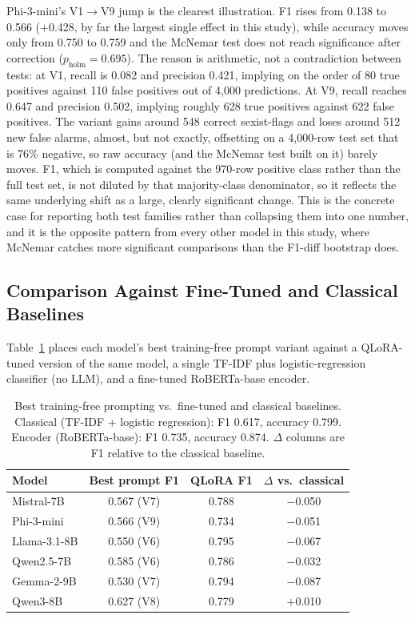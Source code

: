 Phi-3-mini's V1$\to$V9 jump is the clearest illustration. F1 rises from
0.138 to 0.566 (+0.428, by far the largest single effect in this study),
while accuracy moves only from 0.750 to 0.759 and the McNemar test does
not reach significance after correction ($p_{\text{holm}}=0.695$). The
reason is arithmetic, not a contradiction between tests: at V1, recall
is 0.082 and precision 0.421, implying on the order of 80 true positives
against 110 false positives out of 4{,}000 predictions. At V9, recall
reaches 0.647 and precision 0.502, implying roughly 628 true positives
against 622 false positives. The variant gains around 548 correct
sexist-flags and loses around 512 new false alarms, almost, but not
exactly, offsetting on a 4{,}000-row test set that is 76\% negative, so
raw accuracy (and the McNemar test built on it) barely moves. F1, which
is computed against the 970-row positive class rather than the full
test set, is not diluted by that majority-class denominator, so it
reflects the same underlying shift as a large, clearly significant
change. This is the concrete case for reporting both test families
rather than collapsing them into one number, and it is the opposite
pattern from every other model in this study, where McNemar catches
more significant comparisons than the F1-diff bootstrap does.

\subsection{Comparison Against Fine-Tuned and Classical Baselines}
\label{sec:results:baselines}

Table~\ref{tab:baselines} places each model's best training-free prompt
variant against a QLoRA-tuned version of the same model, a single
TF-IDF plus logistic-regression classifier (no LLM), and a
fine-tuned RoBERTa-base encoder.

\begin{table}[t]
\centering
\footnotesize
\caption{Best training-free prompting vs.\ fine-tuned and classical
baselines. Classical (TF-IDF + logistic regression): F1 0.617, accuracy
0.799. Encoder (RoBERTa-base): F1 0.735, accuracy 0.874. $\Delta$
columns are F1 relative to the classical baseline.}
\label{tab:baselines}
\begin{tabular}{lccc}
\toprule
Model & Best prompt F1 & QLoRA F1 & $\Delta$ vs.\ classical \\
\midrule
Mistral-7B & 0.567 (V7) & 0.788 & $-$0.050 \\
Phi-3-mini & 0.566 (V9) & 0.734 & $-$0.051 \\
Llama-3.1-8B & 0.550 (V6) & 0.795 & $-$0.067 \\
Qwen2.5-7B & 0.585 (V6) & 0.786 & $-$0.032 \\
Gemma-2-9B & 0.530 (V7) & 0.794 & $-$0.087 \\
Qwen3-8B & 0.627 (V8) & 0.779 & $+$0.010 \\
\bottomrule
\end{tabular}
\end{table}

